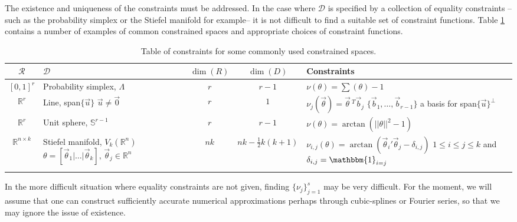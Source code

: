 \documentclass[12 point]{article}
\begin{document}
The existence and uniqueness of the constraints must be addressed.  In the case where $\mathcal{D}$ is specified by a collection of equality constraints -- such as the probability simplex or the Stiefel manifold for example--  it is not difficult to find a suitable set of constraint functions. Table \ref{TABLE:Equality_constraints_examples} contains a number of examples of common constrained spaces and appropriate choices of constraint functions.
\begin{table}[h!]
\begin{center}
\begin{tabular}{| c | m{4 cm} | c | c | m{6cm} |}
\hline
$\mathcal{R}$ & $\mathcal{D}$ & $\dim(R)$ & $\dim(D)$ & Constraints \\
\hline
$[0,1]^r$ & Probability simplex, $\Lambda$ & $r$ & $r-1$ & $\nu(\theta) = \sum(\theta) -1$ \\
\hline
$\mathbb{R}^r$ & Line, span$\{\vec{u}\}$ \newline $\vec{u}\ne\vec{0}$ & $r$ & $1$ & $\nu_j(\vec{\theta}) = \vec{\theta}\,^T\vec{b}_j$ \newline $\{\vec{b}_1,\dots,\vec{b}_{r-1}\}$ a basis for span$\{\vec{u}\}^\perp$ \\
\hline
$\mathbb{R}^r$ & Unit sphere, $\mathbb{S}^{r-1}$ & $r$ & $r-1$ & $\nu(\theta) = \arctan(||\theta||^2 -1)$ \\
\hline
$\mathbb{R}^{n\times k}$ & Stiefel manifold, $V_k(\mathbb{R}^n)$ 
\newline $\theta = [\vec{\theta}_1 | \dots | \vec{\theta}_k], \, \vec{\theta}_j \in \mathbb{R}^n$ & $nk$ & $nk - \frac{1}{2}k(k+1)$ & $\nu_{i,j}(\theta) = \arctan( \vec{\theta}_i'\vec{\theta}_j- \delta_{i,j})$ \newline $1\le i \le j \le k$ and $\delta_{i,j} = \mathbbm{1}_{i=j}$ \\
\hline
 & & & & \\
\hline
\end{tabular}
\end{center}
\caption{Table of constraints for some commonly used constrained spaces.}
\label{TABLE:Equality_constraints_examples}
\end{table}

In the more difficult situation where equality constraints are not given, finding $\{\nu_j\}_{j=1}^s$ may be very difficult. For the moment, we will assume that one can construct sufficiently accurate numerical approximations perhaps through cubic-splines or Fourier series, so that we may ignore the issue of existence. 
\end{document}
